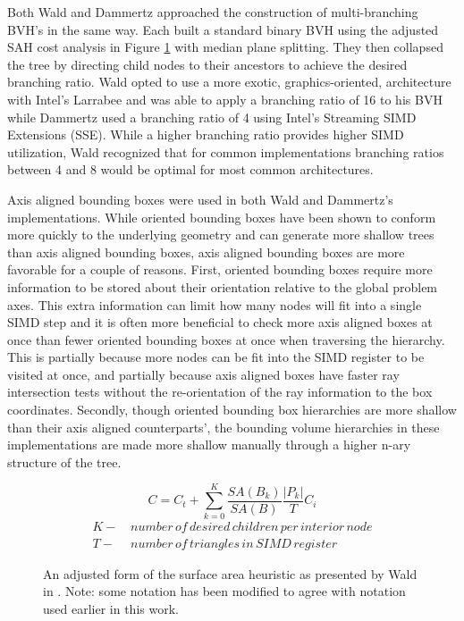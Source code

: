 \documentclass[12pt, a4paper]{article}
\begin{document}
Both Wald and Dammertz approached the construction of multi-branching BVH's in the same way. Each built a standard binary BVH using the adjusted SAH cost analysis in Figure \ref{adjusted_SAH} with median plane splitting. They then collapsed the tree by directing child nodes to their ancestors to achieve the desired branching ratio. Wald opted to use a more exotic, graphics-oriented, architecture  with Intel's Larrabee and was able to apply a branching ratio of 16 to his BVH while Dammertz used a branching ratio of 4 using Intel's Streaming SIMD Extensions (SSE). While a higher branching ratio provides higher SIMD utilization, Wald recognized that for common implementations branching ratios between 4 and 8 would be optimal for most common architectures.

Axis aligned bounding boxes were used in both Wald and Dammertz's implementations. While oriented bounding boxes have been shown to conform more quickly to the underlying geometry and can generate more shallow trees than axis aligned bounding boxes, axis aligned bounding boxes are more favorable for a couple of reasons. First, oriented bounding boxes require more information to be stored about their orientation relative to the global problem axes. This extra information can limit how many nodes will fit into a single SIMD step and it is often more beneficial to check more axis aligned boxes at once than fewer oriented bounding boxes at once when traversing the hierarchy. This is partially because more nodes can be fit into the SIMD register to be visited at once, and partially because axis aligned boxes have faster ray intersection tests without the re-orientation of the ray information to the box coordinates. Secondly, though oriented bounding box hierarchies are more shallow than their axis aligned counterparts', the bounding volume hierarchies in these implementations are made more shallow manually through a higher n-ary structure of the tree. 

\begin{figure}[H]
  \begin{equation}
    C = C_t + \sum_{k=0}^{K} \frac{SA(B_k)}{SA(B)}\frac{|P_k|}{T}C_i
  \end{equation}
  \begin{align*}
    K - & \, number \, of \, desired \, children \, per \, interior \, node \\
    T - & \, number \, of \, triangles \, in \, SIMD \, register
  \end{align*}
  \caption{An adjusted form of the surface area heuristic as presented by Wald in \cite{Wald_2008}. Note: some notation has been modified to agree with notation used earlier in this work.}
  \label{adjusted_SAH}
\end{figure}
\end{document}
